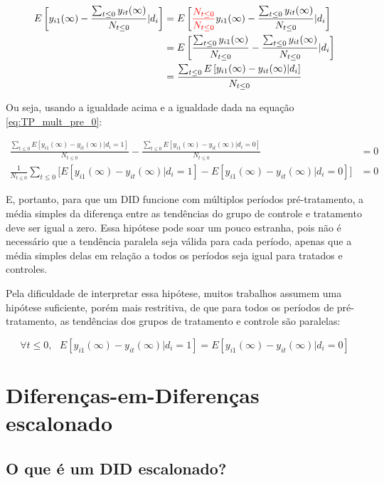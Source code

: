 \documentclass[portugues]{article}
\begin{document}
\[
\begin{split}
    E\left[y_{i1}(\infty) - \frac{\sum_{t\leq0} y_{it}(\infty)}{N_{t\leq0}} | d_i\right] &=  E\left[ \textcolor{red}{\frac{N_{t\leq0}}{N_{t\leq0}}} y_{i1}(\infty) - \frac{\sum_{t\leq0} y_{it}(\infty)}{N_{t\leq0}} | d_i\right] \\
    &= E\left[ \frac{\sum_{t\leq 0} y_{i1}(\infty)}{N_{t\leq0}} - \frac{\sum_{t\leq0} y_{it}(\infty)}{N_{t\leq0}} | d_i\right] \\
    &= \frac{\sum_{t\leq0}  E\left[ y_{i1}(\infty) -y_{it}(\infty) | d_i\right]}{N_{t\leq 0}}
\end{split}
\]

Ou seja, usando a igualdade acima e a igualdade dada na equação \eqref{eq:TP_mult_pre_0}:

\[
\begin{split}
    \frac{\sum_{t\leq0}  E\left[ y_{i1}(\infty) -y_{it}(\infty) | d_i=1\right]}{N_{t\leq 0}} - \frac{\sum_{t\leq0}  E\left[ y_{i1}(\infty) -y_{it}(\infty) | d_i=0\right]}{N_{t\leq 0}} &= 0 \\
    \frac{1}{N_{t\leq0}}  \sum_{t \leq 0} \big[ E\left[ y_{i1}(\infty) - y_{it}(\infty) | d_i=1\right] - E\left[y_{i1}(\infty) - y_{it}(\infty) | d_i=0\right] \big] &=0
\end{split}
\]

E, portanto, para que um DID funcione com múltiplos períodos pré-tratamento, a média simples da diferença entre as tendências do grupo de controle e tratamento deve ser igual a zero. Essa hipótese pode soar um pouco estranha, pois não é necessário que a tendência paralela seja válida para cada período, apenas que a média simples delas em relação a todos os períodos seja igual para tratados e controles. 

Pela dificuldade de interpretar essa hipótese, muitos trabalhos assumem uma hipótese suficiente, porém mais restritiva, de que para todos os períodos de pré-tratamento, as tendências dos grupos de tratamento e controle são paralelas:

$$\forall t \leq 0, \text{ } E[y_{i1}(\infty) - y_{it}(\infty) | d_i=1] = E[y_{i1}(\infty) - y_{it}(\infty) | d_i=0]$$

\section{Diferenças-em-Diferenças escalonado}

\subsection{O que é um DID escalonado?}
\end{document}
